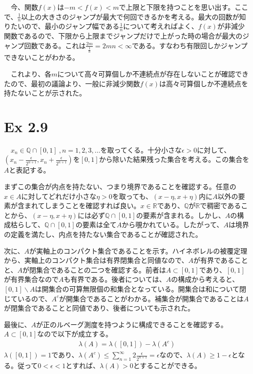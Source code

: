 \documentclass{article}
\begin{document}
　今、関数$f(x)$は$-m < f(x) < m$で上限と下限を持つことを思い出す。ここで、$\frac{1}{n}$以上の大きさのジャンプが最大で何回できるかを考える。最大の回数が知りたいので、最小のジャンプ幅である$\frac{1}{n}$について考えればよく、$f(x)$が非減少関数であるので、下限から上限までジャンプだけで上がった時の場合が最大のジャンプ回数である。これは$\frac{2m}{\frac{1}{n}} = 2mn < \infty$である。すなわち有限回しかジャンプできないことがわかる。

　これより、各$m$について高々可算個しか不連続点が存在しないことが確認できたので、最初の議論より、一般に非減少関数$f(x)$は高々可算個しか不連続点を持たないことが示された。

\section{Ex 2.9}
　$x_n \in \mathbb{Q} \cap [0,1]\ , n = 1,2,3,\dots$を取ってくる。十分小さな$\epsilon > 0$に対して、$\left( x_n -\frac{\epsilon}{2^{n+1}}, x_n + \frac{\epsilon}{2^{n+1}} \right)$を$[0,1]$から除いた結果残った集合を考える。この集合を$A$と表記する。

まずこの集合が内点を持たない、つまり境界であることを確認する。任意の$x \in A$に対してどれだけ小さな$\eta > 0$を取っても、$\left( x-\eta, x + \eta\right)$内に$A$以外の要素が含まれてしまうことを確認すれば良い。$x \in \mathbb{R}$であり、$\mathbb{Q}$が$\mathbb{R}$で稠密であることから、$\left( x-\eta, x + \eta\right)$には必ず$\mathbb{Q} \cap [0,1]$の要素が含まれる。しかし、$A$の構成枯らして、$\mathbb{Q} \cap [0,1]$の要素は全て$A$から覗かれている。したがって、$A$は境界の定義を満たし、内点を持たない集合であることが確認された。

次に、$A$が実軸上のコンパクト集合であることを示す。ハイネボレルの被覆定理から、実軸上のコンパクト集合は有界閉集合と同値なので、$A$が有界であることと、$A$が閉集合であることの二つを確認する。前者は$A \subset [0,1]$であり、$[0,1]$が有界集合なので$A$も有界である。後者については、$A$の構成から考えると、$[0,1]\backslash A$は開集合の可算無限個の和集合となっている。開集合は和について閉じているので、$A^c$が開集合であることがわかる。補集合が開集合であることは$A$が閉集合であることと同値であり、後者についても示された。

最後に、$A$が正のルベーグ測度を持つように構成できることを確認する。$A \subset [0,1]$なので以下が成立する。
\begin{align*}
	\lambda \left( A \right) = \lambda \left( [0,1] \right) - \lambda\left( A^c \right)
\end{align*}
$\lambda \left( [0,1] \right) = 1$であり、$\lambda\left( A^c \right) \leq \sum_{n = 1}^{\infty} 2\frac{\epsilon}{2^{n+1}} = \epsilon$なので、$\lambda \left( A \right) \geq 1-\epsilon$となる。従って$0 < \epsilon < 1$とすれば、$\lambda \left( A \right) > 0$とすることができる。
\end{document}
